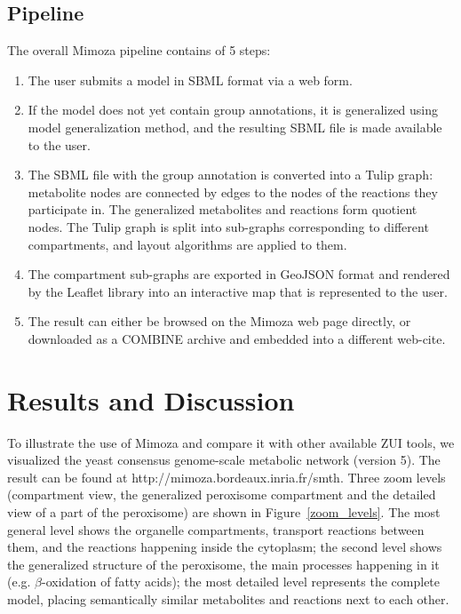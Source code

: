 \documentclass{bmcart}
\begin{document}
 
\subsection*{Pipeline}
The overall Mimoza pipeline  contains of 5 steps:
\begin{enumerate}
\item The user submits a model in SBML format via a web form.
\item If the model does not yet contain group annotations, it is generalized using model generalization method, and the resulting SBML file is made available to the user.
\item The SBML file with the group annotation is converted into a Tulip graph: metabolite nodes are connected by edges to the nodes of the reactions they participate in. The generalized metabolites and reactions form quotient nodes. The Tulip graph is split into sub-graphs corresponding to different compartments, and layout algorithms are applied to them.
\item The compartment sub-graphs are exported in GeoJSON format and rendered by the Leaflet library into an interactive map that is represented to the user.
\item The result can either be browsed on the Mimoza web page directly, or downloaded as a COMBINE archive and embedded into a different web-cite.
\end{enumerate}


\section*{Results and Discussion}
To illustrate the use of Mimoza and compare it with other available ZUI tools, we visualized the yeast consensus genome-scale metabolic network (version 5\cite{Heavner12}). The result can be found at http://mimoza.bordeaux.inria.fr/smth. 
Three zoom levels (compartment view, the generalized peroxisome compartment and the detailed view of a part of the peroxisome) are shown in Figure~\ref{zoom_levels}. The most general level shows the organelle compartments, transport reactions between them, and the reactions happening inside the cytoplasm; the second level shows the generalized structure of the peroxisome, the main processes happening in it (e.g. $\beta$-oxidation of fatty acids\cite{Metzler01}); the most detailed level represents the complete model, placing semantically similar metabolites and reactions next to each other.
\end{document}
